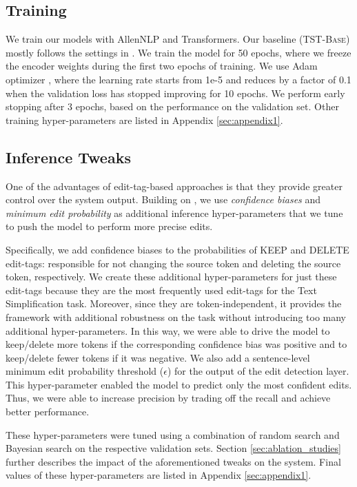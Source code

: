\documentclass[11pt,a4paper]{article}
\begin{document}
\subsection{Training}
We train our models with AllenNLP and Transformers.  
Our baseline (\textsc{TST-Base}) mostly follows the settings in \citet{omelianchuk-etal-2020-gector}. 
We train the model for 50 epochs, where we freeze the encoder weights during the first two epochs of training. We use Adam optimizer \cite{DBLP:journals/corr/KingmaB14}, where the learning rate starts from 1e-5 and reduces by a factor of 0.1 when the validation loss has stopped improving for 10 epochs. We perform early stopping after 3 epochs, based on the performance on the validation set. Other training hyper-parameters are listed in Appendix \ref{sec:appendix1}.

\subsection{Inference Tweaks}
\label{ssec:inference_tweaks_description}
One of the advantages of edit-tag-based approaches is that they provide greater control over the system output. Building on \citet{omelianchuk-etal-2020-gector}, we use \textit{confidence biases} and \textit{minimum edit probability} as additional inference hyper-parameters that we tune to push the model to perform more precise edits. 

Specifically, we add confidence biases to the probabilities of \textsc{KEEP} and \textsc{DELETE} edit-tags: responsible for not changing the source token and deleting the source token, respectively. We create these additional hyper-parameters for just these edit-tags because they are the most frequently used edit-tags for the Text Simplification task. Moreover, since they are token-independent, it provides the framework with additional robustness on the task without introducing too many additional hyper-parameters.
In this way, we were able to drive the model to keep/delete more tokens if the corresponding confidence bias was positive and to keep/delete fewer tokens if it was negative. We also add a sentence-level minimum edit probability threshold ($\epsilon$) for the output of the edit detection layer. This hyper-parameter enabled the model to predict only the most confident edits. Thus, we were able to increase precision by trading off the recall and achieve better performance.



These hyper-parameters were tuned using a combination of random search and Bayesian search \cite{bayesian-opt-nogueira} on the respective validation sets. Section \ref{sec:ablation_studies} further describes the impact of the aforementioned tweaks on the system. Final values of these hyper-parameters are listed in Appendix \ref{sec:appendix1}.
\end{document}
